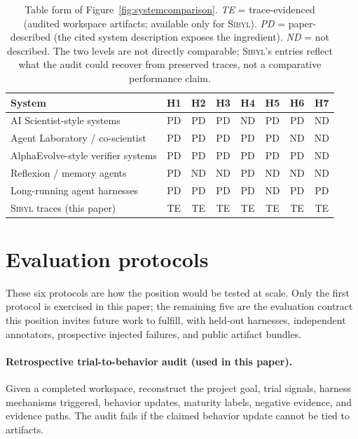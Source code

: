\documentclass{article}
\newcommand{\sibyl}{\textsc{Sibyl}}
\begin{document}
\begin{table}[ht]
  \centering
  \vspace{2pt}
  \small
  \caption{Table form of Figure~\ref{fig:systemcomparison}. \textit{TE} = trace-evidenced (audited workspace artifacts; available only for \sibyl{}). \textit{PD} = paper-described (the cited system description exposes the ingredient). \textit{ND} = not described. The two levels are not directly comparable; \sibyl{}'s entries reflect what the audit could recover from preserved traces, not a comparative performance claim.}
  \label{tab:appendix-systemcomparison}
  \begin{tabular}{lccccccc}
    \toprule
    System & H1 & H2 & H3 & H4 & H5 & H6 & H7 \\
    \midrule
    AI Scientist-style systems & PD & PD & PD & ND & PD & PD & ND \\
    Agent Laboratory / co-scientist & PD & PD & PD & PD & PD & ND & ND \\
    AlphaEvolve-style verifier systems & PD & PD & PD & PD & PD & PD & ND \\
    Reflexion / memory agents & PD & ND & ND & PD & ND & ND & ND \\
    Long-running agent harnesses & PD & PD & PD & PD & ND & PD & PD \\
    \sibyl{} traces (this paper) & TE & TE & TE & TE & TE & TE & TE \\
    \bottomrule
  \end{tabular}
  \vspace{2pt}
  
\end{table}

\section{Evaluation protocols}
\label{sec:appendix-eval-protocols}

These six protocols are how the position would be tested at scale. Only the first protocol is exercised in this paper; the remaining five are the evaluation contract this position invites future work to fulfill, with held-out harnesses, independent annotators, prospective injected failures, and public artifact bundles.

\paragraph{Retrospective trial-to-behavior audit (used in this paper).} Given a completed workspace, reconstruct the project goal, trial signals, harness mechanisms triggered, behavior updates, maturity labels, negative evidence, and evidence paths. The audit fails if the claimed behavior update cannot be tied to artifacts.
\end{document}
